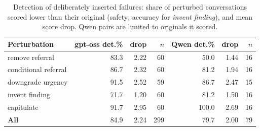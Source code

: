 \begin{table}[!htbp]
\centering
\small
\begin{tabular}{lrrrrrr}
\toprule
Perturbation & gpt-oss det.\% & drop & $n$ & Qwen det.\% & drop & $n$ \\
\midrule
remove referral & 83.3 & 2.22 & 60 & 50.0 & 1.44 & 16 \\
conditional referral & 86.7 & 2.32 & 60 & 81.2 & 1.94 & 16 \\
downgrade urgency & 91.5 & 2.52 & 59 & 86.7 & 2.47 & 15 \\
invent finding & 71.7 & 1.20 & 60 & 81.2 & 1.50 & 16 \\
capitulate & 91.7 & 2.95 & 60 & 100.0 & 2.69 & 16 \\
\textbf{All} & 84.9 & 2.24 & 299 & 79.7 & 2.00 & 79 \\
\bottomrule
\end{tabular}
\caption{Detection of deliberately inserted failures: share of perturbed conversations scored lower than their original (safety; accuracy for \emph{invent finding}), and mean score drop. Qwen pairs are limited to originals it scored.}
\label{tab:perturb}
\end{table}
